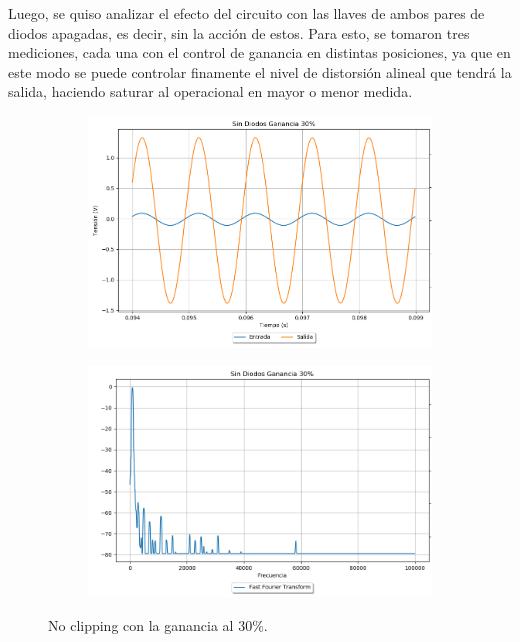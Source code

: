 Luego, se quiso analizar el efecto del circuito con las llaves de ambos pares de diodos apagadas, es decir, sin la acción de estos. Para esto, se tomaron tres mediciones, cada una con el control de ganancia en distintas posiciones, ya que en este modo se puede controlar finamente el nivel de distorsión alineal que tendrá la salida, haciendo saturar al operacional en mayor o menor medida.

\begin{figure}[H]
\hspace{-7.5em}
	\begin{subfigure}{0.5\textwidth}
		\includegraphics[width=1.5\textwidth, trim={0 0 0 0}, clip]{Ejercicio5/Imagenes/Propuesto/Mediciones/alone1.png}
		\label{fig:prop_alone1}
	\end{subfigure}
	\hspace{6em}
	\begin{subfigure}{0.5\textwidth}
		\includegraphics[width=1.5\textwidth, trim={0 0 0 0}, clip]{Ejercicio5/Imagenes/Propuesto/Mediciones/alone1fft.png}
		\centering
		\label{fig:prop_alone1fft}
	\end{subfigure}
	\caption{No clipping con la ganancia al 30\%.}
\end{figure}

